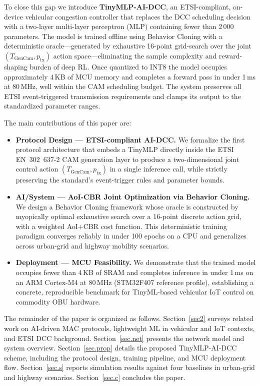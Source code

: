 \documentclass[journal]{IEEEtran}
\begin{document}
To close this gap we introduce \textbf{TinyMLP-AI-DCC}, an
ETSI-compliant, on-device vehicular congestion controller that replaces
the DCC scheduling decision with a two-layer multi-layer perceptron
(MLP) containing fewer than 2\,000 parameters.  The model is trained
offline using Behavior Cloning with a deterministic oracle---generated
by exhaustive 16-point grid-search over the joint~$(T_{\text{GenCam}},
p_{\text{tx}})$ action space---eliminating the sample complexity and
reward-shaping burden of deep RL.  Once quantized to INT8 the model
occupies approximately 4\,KB of MCU memory and completes a forward
pass in under 1\,ms at 80\,MHz, well within the CAM scheduling
budget.  The system preserves all ETSI event-triggered transmission
requirements and clamps its output to the standardized parameter
ranges.

The main contributions of this paper are:

\begin{itemize}[leftmargin=2em]
  \item[\textbf{C1}] \textbf{Protocol Design --- ETSI-compliant AI-DCC.}
    We formalize the first protocol architecture that embeds a TinyMLP
    directly inside the ETSI EN~302~637-2 CAM generation layer to
    produce a two-dimensional joint control action
    $(T_{\text{GenCam}}, p_{\text{tx}})$ in a single inference call,
    while strictly preserving the standard's event-trigger rules and
    parameter bounds.
  \item[\textbf{C2}] \textbf{AI/System --- AoI-CBR Joint Optimization via Behavior Cloning.}
    We design a Behavior Cloning framework whose oracle is constructed
    by myopically optimal exhaustive search over a 16-point discrete
    action grid, with a weighted AoI+CBR cost function.  This
    deterministic training paradigm converges reliably in under
    100 epochs on a CPU and generalizes across urban-grid and
    highway mobility scenarios.
  \item[\textbf{C3}] \textbf{Deployment --- MCU Feasibility.}
    We demonstrate that the trained model occupies fewer than 4\,KB
    of SRAM and completes inference in under 1\,ms on an ARM
    Cortex-M4 at 80\,MHz (STM32F407 reference profile), establishing
    a concrete, reproducible benchmark for TinyML-based vehicular
    IoT control on commodity OBU hardware.
\end{itemize}

The remainder of the paper is organized as follows.
Section~\ref{sec2} surveys related work on AI-driven MAC protocols,
lightweight ML in vehicular and IoT contexts, and ETSI DCC background.
Section~\ref{sec.net} presents the network model and system overview.
Section~\ref{sec.prop} details the proposed TinyMLP-AI-DCC scheme,
including the protocol design, training pipeline, and MCU deployment
flow.  Section~\ref{sec.s} reports simulation results against four
baselines in urban-grid and highway scenarios.
Section~\ref{sec.c} concludes the paper.
\end{document}
